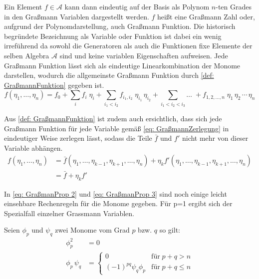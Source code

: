 \noindent  Ein Element $f\in\mathcal A$ kann dann eindeutig auf der Basis als Polynom $n$-ten Grades in den Graßmann Variablen dargestellt werden. $f$ heißt eine Graßmann Zahl oder, aufgrund der Polynomdarstellung, auch Graßmann Funktion. Die historisch begründete Bezeichnung als Variable oder Funktion ist dabei ein wenig irreführend da sowohl die Generatoren als auch die Funktionen fixe Elemente der selben Algebra $\mathcal A$ sind und keine variablen Eigenschaften aufweisen. Jede Graßmann Funktion lässt sich als eindeutige Linearkombination der Monome darstellen, wodurch die allgemeinste Graßmann Funktion durch \eqref{def: GraßmannFunktion} gegeben ist.
\begin{equation} \label{def: GraßmannFunktion}
    f(\eta_1, \dots ,\eta_n) = f_0 + \sum_{i} f_i \;\eta_i + \sum_{i_1<i_2} f_{i_1,i_2} \;\eta_{i_1} \,\eta_{i_2} + \sum_{i_1<i_2<i_3} \dots \;+ f_{1,2,\dots,n} \; \eta_{1}\,\eta_{2}\,\cdots\,\eta_{n}
\end{equation}

\noindent Aus \eqref{def: GraßmannFunktion} ist zudem auch ersichtlich, dass sich jede Graßmann Funktion für jede Variable gemäß \eqref{eq: GraßmannZerlegung} in eindeutiger Weise zerlegen lässt, sodass die Teile $\bar f$ und $f'$ nicht mehr von dieser Variable abhängen. 
\begin{align} 
    f(\eta_1,\dots,\eta_n) &= \bar f(\eta_1,\dots,\eta_{k-1},\eta_{k+1}, \dots ,\eta_n) + \eta_k f'(\eta_1,\dots,\eta_{k-1},\eta_{k+1}, \dots ,\eta_n) \nonumber\\
        & = \bar f + \eta_k f' \label{eq: GraßmannZerlegung}
\end{align}

\noindent In \eqref{eq: GraßmanProp 2} und \eqref{eq: GraßmanProp 3} sind noch einige leicht einsehbare Rechenregeln für die Monome gegeben. Für p=1 ergibt sich der Spezialfall einzelner Grassmann Variablen.
\begin{grayframe}
    Seien $\phi_p$ und $\psi_q$ zwei Monome vom Grad $p$ bzw. $q$ so gilt:
    \begin{align}
        \phi_p^2 &= 0  \label{eq: GraßmanProp 2}\\
        \phi_p \, \psi_q &= \left\{ \begin{array}{ll} 0 & \text{für}\; p+q > n \\ (-1)^{pq} \psi_q \phi_p  & \text{für}\; p+q \leq n\end{array} \right. \label{eq: GraßmanProp 3}
    \end{align}
\end{grayframe}

